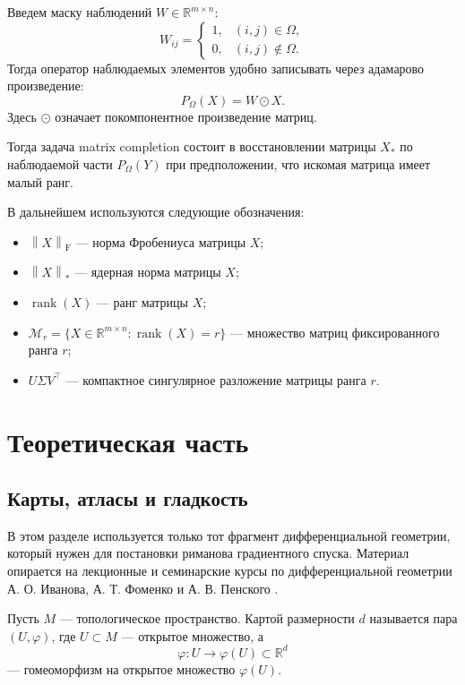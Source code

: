 \documentclass[a4paper,12pt]{article}
\newcommand{\R}{\mathbb{R}}
\newcommand{\fro}[1]{\left\lVert #1 \right\rVert_{\mathrm F}}
\newcommand{\nuc}[1]{\left\lVert #1 \right\rVert_*}
\newcommand{\rank}{\operatorname{rank}}
\renewcommand{\Proj}{P}
\newcommand{\Mcal}{\mathcal{M}}
\begin{document}
\begin{definition}
    Введем маску наблюдений $W\in\R^{m\times n}$:
    \[
        W_{ij} =
        \begin{cases}
            1, & (i,j)\in\Omega,    \\
            0, & (i,j)\notin\Omega.
        \end{cases}
    \]
    Тогда оператор наблюдаемых элементов удобно записывать через адамарово произведение:
    \[
        \Proj_\Omega(X)=W\odot X.
    \]
    Здесь $\odot$ означает покомпонентное произведение матриц.
\end{definition}

Тогда задача matrix completion состоит в восстановлении матрицы $X_*$ по наблюдаемой части $\Proj_\Omega(Y)$ при предположении, что искомая матрица имеет малый ранг.

В дальнейшем используются следующие обозначения:
\begin{itemize}
    \item $\fro{X}$ --- норма Фробениуса матрицы $X$;
    \item $\nuc{X}$ --- ядерная норма матрицы $X$;
    \item $\rank(X)$ --- ранг матрицы $X$;
    \item $\Mcal_r = \{X \in \R^{m\times n} : \rank(X)=r\}$ --- множество матриц фиксированного ранга $r$;
    \item $U\Sigma V^\top$ --- компактное сингулярное разложение матрицы ранга $r$.
\end{itemize}

\newpage

\section{Теоретическая часть}
\label{sec:theory}

\subsection{Карты, атласы и гладкость}

В этом разделе используется только тот фрагмент дифференциальной геометрии, который нужен для постановки риманова градиентного спуска. Материал опирается на лекционные и семинарские курсы по дифференциальной геометрии А. О. Иванова, А. Т. Фоменко и А. В. Пенского \cite{ivanov-dg,fomenko-dg,penskoy-seminars}.

\begin{definition}
    Пусть $M$ --- топологическое пространство. Картой размерности $d$ называется пара $(U,\varphi)$, где $U\subset M$ --- открытое множество, а
    \[
        \varphi:U\to \varphi(U)\subset\R^d
    \]
    --- гомеоморфизм на открытое множество $\varphi(U)$.
\end{definition}
\end{document}
